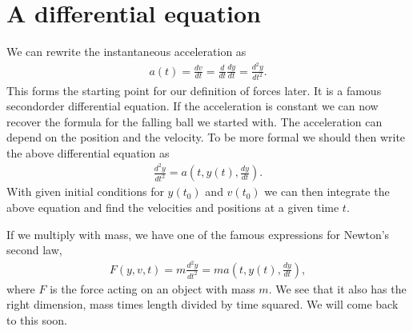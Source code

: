 \documentclass[letterpaper,10pt,english]{sphinxmanual}
\begin{document}
\section{A differential equation}
\label{\detokenize{chapter1:a-differential-equation}}
We can rewrite the instantaneous acceleration as
\begin{equation*}
\begin{split}
a(t) = \frac{dv}{dt}=\frac{d}{dt}\frac{dy}{dt}=\frac{d^2y}{dt^2}.
\end{split}
\end{equation*}
This forms the starting point for our definition of forces later. It is a famous second\sphinxhyphen{}order differential equation. If the acceleration is constant we can now recover the formula for the falling ball we started with.
The acceleration can depend on the position and the velocity. To be more formal we should then write the above differential equation as
\begin{equation*}
\begin{split}
\frac{d^2y}{dt^2}=a(t,y(t),\frac{dy}{dt}).
\end{split}
\end{equation*}
With given initial conditions for \(y(t_0)\) and \(v(t_0)\) we can then
integrate the above equation and find the velocities and positions at
a given time \(t\).

If we multiply with mass, we have one of the famous expressions for Newton’s second law,
\begin{equation*}
\begin{split}
F(y,v,t)=m\frac{d^2y}{dt^2}=ma(t,y(t),\frac{dy}{dt}),
\end{split}
\end{equation*}
where \(F\) is the force acting on an object with mass \(m\). We see that it also has the right dimension, mass times length divided by time squared.
We will come back to this soon.
\end{document}

